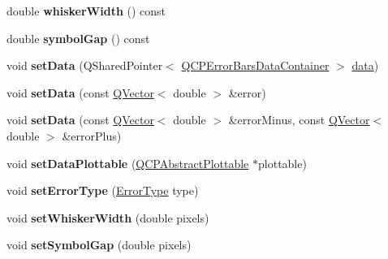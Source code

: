\begin{DoxyCompactItemize}
\item 
\mbox{\label{class_q_c_p_error_bars_ae5a292470366ec92b248753f83b8646e}} 
double {\bfseries whisker\+Width} () const
\item 
\mbox{\label{class_q_c_p_error_bars_a2c969749fa0db565a42b80db9da5f388}} 
double {\bfseries symbol\+Gap} () const
\item 
\mbox{\label{class_q_c_p_error_bars_a92b1980003255f5f7c05407a4d92aabc}} 
void {\bfseries set\+Data} (Q\+Shared\+Pointer$<$ \hyperlink{class_q_vector}{Q\+C\+P\+Error\+Bars\+Data\+Container} $>$ \hyperlink{class_q_c_p_error_bars_aeebd1b14f4c3573565efafd514988813}{data})
\item 
\mbox{\label{class_q_c_p_error_bars_a2f33d68a7ec163b09017dce3d9d3abcc}} 
void {\bfseries set\+Data} (const \hyperlink{class_q_vector}{Q\+Vector}$<$ double $>$ \&error)
\item 
\mbox{\label{class_q_c_p_error_bars_aac0cf070b957c11177e91b02bcb433c8}} 
void {\bfseries set\+Data} (const \hyperlink{class_q_vector}{Q\+Vector}$<$ double $>$ \&error\+Minus, const \hyperlink{class_q_vector}{Q\+Vector}$<$ double $>$ \&error\+Plus)
\item 
\mbox{\label{class_q_c_p_error_bars_aabb42a964cfbf780cd1c79850c7cd989}} 
void {\bfseries set\+Data\+Plottable} (\hyperlink{class_q_c_p_abstract_plottable}{Q\+C\+P\+Abstract\+Plottable} $\ast$plottable)
\item 
\mbox{\label{class_q_c_p_error_bars_af0af493d454a8f3a0908830160680d2b}} 
void {\bfseries set\+Error\+Type} (\hyperlink{class_q_c_p_error_bars_a95f0220f11a72648b96480a85ce26474}{Error\+Type} type)
\item 
\mbox{\label{class_q_c_p_error_bars_ad05f6ff9e46c6047f1cd2459744b7b59}} 
void {\bfseries set\+Whisker\+Width} (double pixels)
\item 
\mbox{\label{class_q_c_p_error_bars_a280ee8d863d8a2630c309701d019b3de}} 
void {\bfseries set\+Symbol\+Gap} (double pixels)

\end{DoxyCompactItemize}

